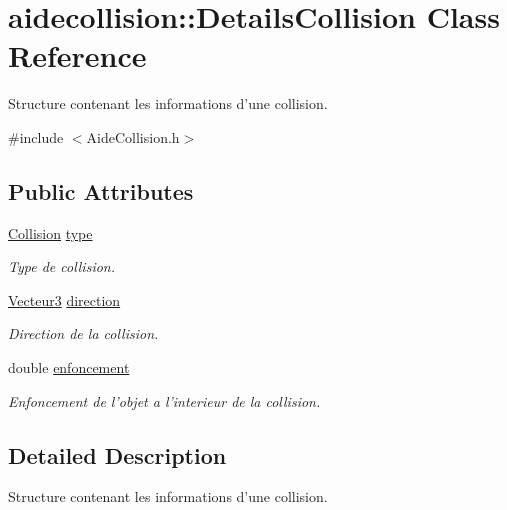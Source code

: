 \hypertarget{classaidecollision_1_1_details_collision}{\section{aidecollision\-:\-:Details\-Collision Class Reference}
\label{classaidecollision_1_1_details_collision}
}


Structure contenant les informations d'une collision.  




{\ttfamily \#include $<$Aide\-Collision.\-h$>$}

\subsection*{Public Attributes}
\begin{DoxyCompactItemize}
\item 
\hyperlink{namespaceaidecollision_a1c8613e2393aa3268262f9d23d60c0c9}{Collision} \hyperlink{classaidecollision_1_1_details_collision_a524989691331ea39d2c14c639f0de02e}{type}
\begin{DoxyCompactList}\small\item\em Type de collision. \end{DoxyCompactList}\item 
\hyperlink{group__utilitaire_ga541aa4837ad9250d3a248dc82ee9ad4d}{Vecteur3} \hyperlink{classaidecollision_1_1_details_collision_a4ffc7c26ed439fca9cc1b1b77c741ce8}{direction}
\begin{DoxyCompactList}\small\item\em Direction de la collision. \end{DoxyCompactList}\item 
double \hyperlink{classaidecollision_1_1_details_collision_a6aa4cae3f313a2a16608dd60da0f97d1}{enfoncement}
\begin{DoxyCompactList}\small\item\em Enfoncement de l'objet a l'interieur de la collision. \end{DoxyCompactList}\end{DoxyCompactItemize}


\subsection{Detailed Description}
Structure contenant les informations d'une collision. 

